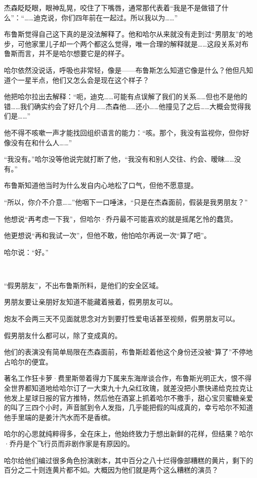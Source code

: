 \documentclass[../main]{subfiles}
\begin{document}
杰森眨眨眼，眼神乱晃，咬住了下嘴唇，通常那代表着“我是不是做错了什么”：“……迪克说，你们四年前在一起过。所以我以为……”

布鲁斯觉得自己这下真的是没法解释了。他和哈尔从来就没有走到过“男朋友”的地步，可他家里儿子却一个两个都这么觉得，唯一合理的解释就是……这段关系对布鲁斯而言，并不是哈尔想要它是的样子。

哈尔依然没说话，呼吸也非常轻，像是——布鲁斯怎么知道它像是什么？他但凡知道个一星半点，他们又怎么会是现在这个样子？

他把哈尔拉出去解释：“呃，迪克……可能有点误解了我们的关系……但也不是他的错……我们确实约会了好几个月……杰森他……还小……他撞见了之后……大概会觉得我们是……”

他不得不咳嗽一声才能找回组织语言的能力：“咳。那个，我没有监视你，但你好像没有在和什么人……”

“我没有。”哈尔没等他说完就打断了他，“我没有和别人交往、约会、暧昧……没有。”

布鲁斯知道他当时为什么发自内心地松了口气，但他不愿意提。

“所以，你介不介意……”他咽下一口唾沫，“只是在杰森面前，假装是我男朋友？”

他想说“再考虑一下我”，但哈尔·乔丹最不可能喜欢的就是摇尾乞怜的蠢货。

他更想说“再和我试一次”，但他不敢，他怕哈尔再说一次“算了吧”。

哈尔说：“好。”

~\

“假男朋友”，不出布鲁斯所料，是他们的安全区域。

男朋友要让亲朋好友知道不能藏着掖着，假男朋友可以。

炮友不会两三天不见面就思念对方到要打性爱电话甚至视频，假男朋友可以。

假男朋友什么都可以，除了变成真的。

他们的表演没有简单局限在杰森面前，布鲁斯趁着他这个身份还没被“算了”不停地占哈尔的便宜。

著名工作狂卡萝·费里斯带着得力下属来东海岸谈合作，布鲁斯光明正大，恨不得全世界都知道地给哈尔订了一大束九十九朵红玫瑰，就差没把小票快递给克拉克让他发上星球日报的官方推特，然后他在酒宴上抓着哈尔不撒手，甜心宝贝蜜糖亲爱的叫了三四个小时，声音腻到令人发指，几乎能把假的叫成真的，幸亏哈尔不知道他手里端的是姜汁汽水而不是香槟。

哈尔的心思就纯粹得多，全在床上，他始终致力于想出新鲜的花样，但结果？哈尔·乔丹是个飞行员而非剧作家是有原因的。

哈尔给他们编过很多角色扮演剧本，其中百分之八十烂得像部糟糕的黄片，剩下的百分之二十则连黄片都不如。大概因为他们就是两个这么糟糕的演员？
\end{document}

